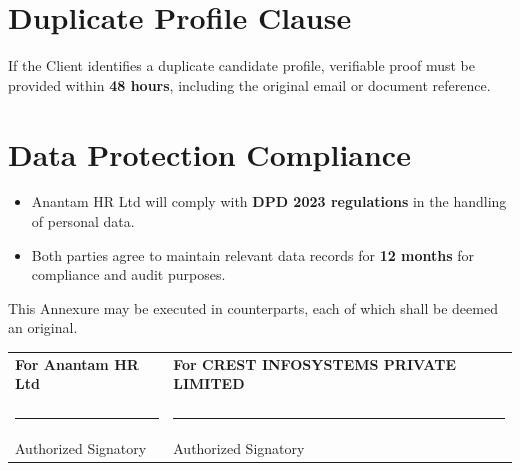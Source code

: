 \documentclass[12pt]{article}
\begin{document}
\section{Duplicate Profile Clause}

If the Client identifies a duplicate candidate profile, verifiable proof must be provided within \textbf{48 hours}, including the original email or document reference.

\section{Data Protection Compliance}

\begin{itemize}
\item Anantam HR Ltd will comply with \textbf{DPD 2023 regulations} in the handling of personal data.

\item Both parties agree to maintain relevant data records for \textbf{12 months} for compliance and audit purposes.
\end{itemize}

This Annexure may be executed in counterparts, each of which shall be deemed an original.

\vspace{1.5cm}

\begin{tabular}{p{7cm} p{7cm}}

\textbf{For Anantam HR Ltd} & \textbf{For CREST INFOSYSTEMS PRIVATE LIMITED} \\

\vspace{2cm} & \vspace{2cm} \\

\rule{6cm}{0.4pt} & \rule{6cm}{0.4pt} \\
Authorized Signatory & Authorized Signatory \\

\end{tabular}
\end{document}
